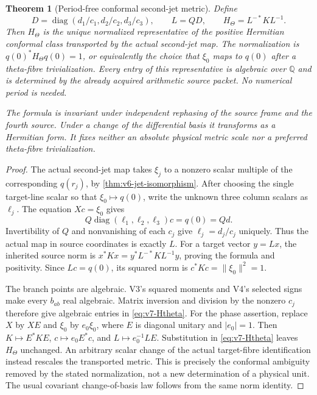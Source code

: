 \documentclass[11pt]{article}
\newtheorem{theorem}{Theorem}[section]
\theoremstyle{definition}
\theoremstyle{remark}
\newcommand{\Q}{\mathbb Q}
\newcommand{\norm}[1]{\lVert#1\rVert}
\begin{document}
\begin{theorem}[Period-free conformal second-jet metric]
\label{thm:v7-metric-reconstruction}
Define
\begin{equation}
 D=\operatorname{diag}(d_1/c_1,d_2/c_2,d_3/c_3),\qquad L=QD,\qquad
 \boxed{H_\Theta=L^{-*}KL^{-1}.}
 \label{eq:v7-Htheta}
\end{equation}
Then $H_\Theta$ is the unique normalized representative of the positive
Hermitian conformal class transported by the actual second-jet map. The
normalization is $q(0)^*H_\Theta q(0)=1$, or equivalently the choice that
$\xi_0$ maps to $q(0)$ after a theta-fibre trivialization. Every entry of this
representative is algebraic over $\Q$ and is determined by the already
acquired arithmetic source packet. No numerical period is needed.

The formula is invariant under independent rephasing of the source frame and
the fourth source. Under a change of the differential basis it transforms as
a Hermitian form. It fixes neither an absolute physical metric scale nor a
preferred theta-fibre trivialization.
\end{theorem}
\begin{proof}
The actual second-jet map takes $\xi_j$ to a nonzero scalar multiple of the
corresponding $q(r_j)$, by \cref{thm:v6-jet-isomorphism}. After choosing the
single target-line scalar so that $\xi_0\mapsto q(0)$, write the unknown
three column scalars as $\ell_j$. The equation $Xc=\xi_0$ gives
\[
 Q\operatorname{diag}(\ell_1,\ell_2,\ell_3)c=q(0)=Qd.
\]
Invertibility of $Q$ and nonvanishing of each $c_j$ give
$\ell_j=d_j/c_j$ uniquely. Thus the actual map in source coordinates is
exactly $L$. For a target vector $y=Lx$, the inherited source norm is
$x^*Kx=y^*L^{-*}KL^{-1}y$, proving the formula and positivity.
Since $Lc=q(0)$, its squared norm is $c^*Kc=\norm{\xi_0}^2=1$.

The branch points are algebraic. V3's squared moments and V4's selected signs
make every $b_{ab}$ real algebraic. Matrix inversion and division by the
nonzero $c_j$ therefore give algebraic entries in \eqref{eq:v7-Htheta}.
For the phase assertion, replace $X$ by $XE$ and $\xi_0$ by $e_0\xi_0$,
where $E$ is diagonal unitary and $|e_0|=1$. Then
$K\mapsto E^*KE$, $c\mapsto e_0E^*c$, and $L\mapsto e_0^{-1}LE$.
Substitution in \eqref{eq:v7-Htheta} leaves $H_\Theta$ unchanged.
An arbitrary scalar change of the actual target-fibre identification instead
rescales the transported metric. This is precisely the conformal ambiguity
removed by the stated normalization, not a new determination of a physical
unit. The usual covariant change-of-basis law follows from the same norm
identity.
\end{proof}
\end{document}
